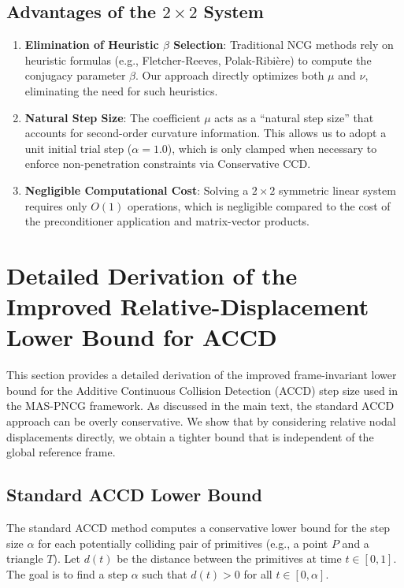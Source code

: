 \documentclass[acmtog,anonymous,review,screen,nonacm]{acmart}
\begin{document}
\subsection{Advantages of the \texorpdfstring{$2 \times 2$}{2x2} System}
\begin{enumerate}
    \item \textbf{Elimination of Heuristic $\beta$ Selection}: Traditional NCG methods rely on heuristic formulas (e.g., Fletcher-Reeves, Polak-Ribière) to compute the conjugacy parameter $\beta$. Our approach directly optimizes both $\mu$ and $\nu$, eliminating the need for such heuristics.
    \item \textbf{Natural Step Size}: The coefficient $\mu$ acts as a ``natural step size'' that accounts for second-order curvature information. This allows us to adopt a unit initial trial step ($\alpha = 1.0$), which is only clamped when necessary to enforce non-penetration constraints via Conservative CCD.
    \item \textbf{Negligible Computational Cost}: Solving a $2 \times 2$ symmetric linear system requires only $O(1)$ operations, which is negligible compared to the cost of the preconditioner application and matrix-vector products.
\end{enumerate}

\section{Detailed Derivation of the Improved Relative-Displacement Lower Bound for ACCD}
\label{sec:accd_derivation}
This section provides a detailed derivation of the improved frame-invariant lower bound for the Additive Continuous Collision Detection (ACCD) step size used in the MAS-PNCG framework. As discussed in the main text, the standard ACCD approach \cite{li2021codimensional} can be overly conservative. We show that by considering relative nodal displacements directly, we obtain a tighter bound that is independent of the global reference frame.

\subsection{Standard ACCD Lower Bound}
The standard ACCD method computes a conservative lower bound for the step size $\alpha$ for each potentially colliding pair of primitives (e.g., a point $P$ and a triangle $T$). Let $d(t)$ be the distance between the primitives at time $t \in [0, 1]$. The goal is to find a step $\alpha$ such that $d(t) > 0$ for all $t \in [0, \alpha]$.
\end{document}
